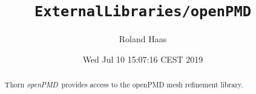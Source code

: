 \documentclass{article}
\begin{document}
\title{\tt ExternalLibraries/openPMD}
\author{Roland Haas}
\date{ Wed Jul 10 15:07:16 CEST 2019 }

\maketitle


\ifx\ThisThorn\undefined
\newcommand{\ThisThorn}{{\it openPMD}}
\else
\renewcommand{\ThisThorn}{{\it openPMD}}
\fi

\begin{abstract}
Thorn \ThisThorn\ provides access to the openPMD mesh refinement library.
\end{abstract}

\end{document}
